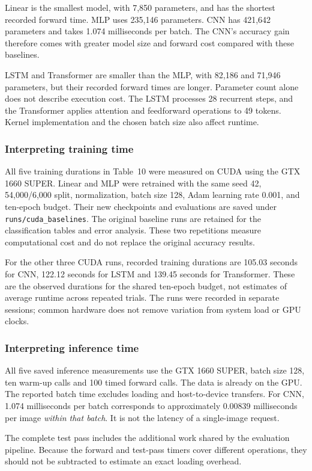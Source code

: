 Linear is the smallest model, with 7,850 parameters, and has the shortest
recorded forward time. MLP uses 235,146 parameters.
CNN has 421,642 parameters and takes 1.074 milliseconds per batch.
The CNN's accuracy gain therefore comes with greater model size and forward
cost compared with these baselines.

LSTM and Transformer are smaller than the MLP, with 82,186 and 71,946 parameters,
but their recorded forward times are longer. Parameter count alone does not
describe execution cost. The LSTM processes 28 recurrent steps, and the
Transformer applies attention and feedforward operations to 49 tokens.
Kernel implementation and the chosen batch size also affect runtime.

\subsubsection{Interpreting training time}
All five training durations in Table~10 were measured on CUDA
using the GTX 1660 SUPER. Linear and MLP were retrained with the same seed 42,
54,000/6,000 split, normalization, batch size 128, Adam learning rate 0.001,
and ten-epoch budget. Their new checkpoints and evaluations are saved under
\texttt{runs/cuda\_baselines}. The original baseline runs are retained for the
classification tables and error analysis. These two repetitions measure
computational cost and do not replace the original accuracy results.

For the other three CUDA runs, recorded training durations are 105.03 seconds for
CNN, 122.12 seconds for LSTM and 139.45 seconds for Transformer. These are the
observed durations for the shared ten-epoch budget, not estimates of average
runtime across repeated trials. The runs were recorded in separate sessions;
common hardware does not remove variation from system load or GPU clocks.

\subsubsection{Interpreting inference time}
All five saved inference measurements use the GTX 1660 SUPER, batch size 128,
ten warm-up calls and 100 timed forward calls. The data is already on the GPU.
The reported batch time excludes loading and host-to-device transfers.
For CNN, 1.074 milliseconds per batch corresponds to approximately
0.00839 milliseconds per image \emph{within that batch}. It is not the latency
of a single-image request.

The complete test pass includes the additional work shared by the evaluation
pipeline. Because the forward and test-pass timers cover different operations,
they should not be subtracted to estimate an exact loading overhead.


